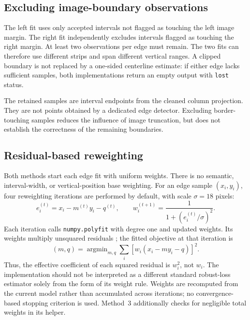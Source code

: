 \subsection{Excluding image-boundary observations}
\label{subsec:c4_edge_samples}

The left fit uses only accepted intervals not flagged as touching the
left image margin. The right fit independently excludes intervals
flagged as touching the right margin. At least two observations per edge
must remain. The two fits can therefore use different strips and span
different vertical ranges. A clipped boundary is not replaced by a
one-sided centerline estimate: if either edge lacks sufficient samples,
both implementations return an empty output with \texttt{lost} status.

The retained samples are interval endpoints from the cleaned column
projection. They are not points obtained by a dedicated edge detector.
Excluding border-touching samples reduces the influence of image
truncation, but does not establish the correctness of the remaining
boundaries.

\subsection{Residual-based reweighting}
\label{subsec:c4_robust_fit}

Both methods start each edge fit with uniform weights. There is no
semantic, interval-width, or vertical-position base weighting. For an
edge sample $(x_i,y_i)$, four reweighting iterations are performed by
default, with scale $\sigma=18$ pixels:
\begin{equation}
    e_i^{(t)}=x_i-m^{(t)}y_i-q^{(t)},\qquad
    w_i^{(t+1)}=\frac{1}{1+(e_i^{(t)}/\sigma)^2}.
    \label{eq:c4_reweight}
\end{equation}
Each iteration calls \texttt{numpy.polyfit} with degree one and updated
weights. Its weights multiply unsquared residuals
\cite{numpyPolyfitDocumentation}; the fitted objective at that iteration is
\begin{equation}
    (m,q)=\mathop{\arg\min}_{m,q}
        \sum_i \left[w_i(x_i-my_i-q)\right]^2.
    \label{eq:c4_objective}
\end{equation}
Thus, the effective coefficient of each squared residual is $w_i^2$,
not $w_i$. The implementation should not be interpreted as a different
standard robust-loss estimator solely from the form of its weight rule.
Weights are recomputed from the current model rather than accumulated
across iterations; no convergence-based stopping criterion is used.
Method~3 additionally checks for negligible total weights in its helper.

